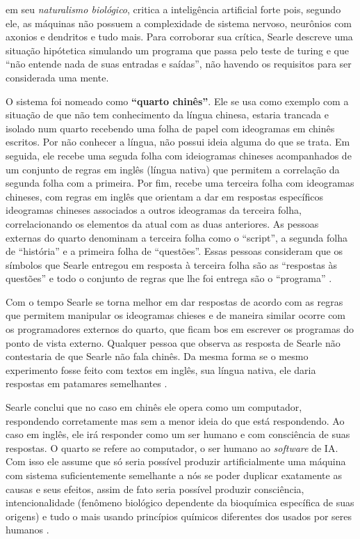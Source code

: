\documentclass[
]{book}
\begin{document}
\citet{searle1980minds} em seu \emph{naturalismo biológico}, critica a inteligência artificial forte pois, segundo ele, as máquinas não possuem a complexidade de sistema nervoso, neurônios com axonios e dendritos e tudo mais. Para corroborar sua crítica, Searle descreve uma situação hipótetica simulando um programa que passa pelo teste de turing e que ``não entende nada de suas entradas e saídas'', não havendo os requisitos para ser considerada uma mente.

O sistema foi nomeado como \textbf{``quarto chinês''}. Ele se usa como exemplo com a situação de que não tem conhecimento da língua chinesa, estaria trancada e isolado num quarto recebendo uma folha de papel com ideogramas em chinês escritos. Por não conhecer a língua, não possui ideia alguma do que se trata. Em seguida, ele recebe uma seguda folha com ideiogramas chineses acompanhados de um conjunto de regras em inglês (língua nativa) que permitem a correlação da segunda folha com a primeira. Por fim, recebe uma terceira folha com ideogramas chineses, com regras em inglês que orientam a dar em respostas específicos ideogramas chineses associados a outros ideogramas da terceira folha, correlacionando os elementos da atual com as duas anteriores. As pessoas externas do quarto denominam a terceira folha como o ``script'', a segunda folha de ``história'' e a primeira folha de ``questões''. Essas pessoas consideram que os símbolos que Searle entregou em resposta à terceira folha são as ``respostas às questões'' e todo o conjunto de regras que lhe foi entrega são o ``programa'' \citep{guimaraes2019inteligencia}.

Com o tempo Searle se torna melhor em dar respostas de acordo com as regras que permitem manipular os ideogramas chieses e de maneira similar ocorre com os programadores externos do quarto, que ficam bos em escrever os programas do ponto de vista externo. Qualquer pessoa que observa as resposta de Searle não contestaria de que Searle não fala chinês. Da mesma forma se o mesmo experimento fosse feito com textos em inglês, sua língua nativa, ele daria respostas em patamares semelhantes \citep{guimaraes2019inteligencia}.

Searle conclui que no caso em chinês ele opera como um computador, respondendo corretamente mas sem a menor ideia do que está respondendo. Ao caso em inglês, ele irá responder como um ser humano e com consciência de suas respostas. O quarto se refere ao computador, o ser humano ao \emph{software} de IA. Com isso ele assume que só seria possível produzir artificialmente uma máquina com sistema suficientemente semelhante a nós se poder duplicar exatamente as causas e seus efeitos, assim de fato seria possível produzir consciência, intencionalidade (fenômeno biológico dependente da
bioquímica específica de suas origens) e tudo o mais usando princípios químicos diferentes dos usados por seres humanos \citep{searle1980minds} .
\end{document}
